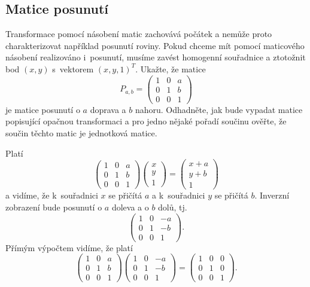 \konec

\stranka

\subsection{Matice posunutí}
Transformace pomocí násobení matic zachovává počátek a nemůže proto charakterizovat například posunutí roviny. Pokud chceme mít
pomocí maticového násobení realizováno i posunutí, musíme zavést
homogenní souřadnice a ztotožnit bod $(x,y)$ s vektorem
$(x,y,1)^T$. Ukažte, že matice
\begin{equation*}P_{a,b}=
\begin{pmatrix}
  1& 0& a\\
  0 & 1 & b\\
  0& 0& 1
\end{pmatrix}
\end{equation*}
je matice posunutí o $a$ doprava a $b$ nahoru. Odhadněte, jak bude
vypadat matice popisující opačnou transformaci a pro jedno nějaké pořadí
součinu ověřte, že součin těchto matic je jednotková matice.

\reseni
Platí
\begin{equation*}
\begin{pmatrix}
  1& 0& a\\
  0 & 1 & b\\
  0& 0& 1
\end{pmatrix}
\begin{pmatrix}
  x\\y\\1
\end{pmatrix}
=
\begin{pmatrix}
  x+a\\y+b\\1
\end{pmatrix}
\end{equation*}
a vidíme, že k souřadnici $x$ se přičítá $a$ a k souřadnici $y$ se přičítá $b$.
Inverzní zobrazení bude posunutí o $a$ doleva a o $b$ dolů, tj. 
\begin{equation*}
  \begin{pmatrix}
  1& 0& -a\\
  0 & 1 & -b\\
  0& 0& 1
\end{pmatrix}.
\end{equation*}
Přímým výpočtem vidíme, že platí
\begin{equation*}
  \begin{pmatrix}
  1& 0& a\\
  0 & 1 & b\\
  0& 0& 1
\end{pmatrix}
  \begin{pmatrix}
  1& 0& -a\\
  0 & 1 & -b\\
  0& 0& 1
\end{pmatrix}=
  \begin{pmatrix}
  1& 0& 0\\
  0 & 1 & 0\\
  0& 0& 1
\end{pmatrix}.
\end{equation*}

